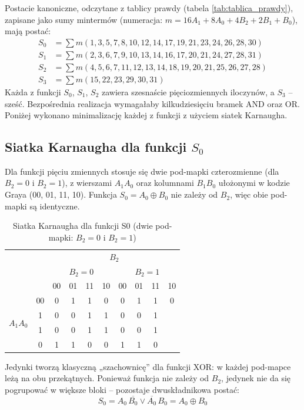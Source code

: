 \documentclass[11pt]{article}
\begin{document}
Postacie kanoniczne, odczytane z tablicy prawdy (tabela \ref{tab:tablica_prawdy}), zapisane jako sumy mintermów (numeracja: \(m = 16A_1 + 8A_0 + 4B_2 + 2B_1 + B_0\)), mają postać:
\begin{align}
S_0 &= \sum m(1,3,5,7,8,10,12,14,17,19,21,23,24,26,28,30) \\
S_1 &= \sum m(2,3,6,7,9,10,13,14,16,17,20,21,24,27,28,31) \\
S_2 &= \sum m(4,5,6,7,11,12,13,14,18,19,20,21,25,26,27,28) \\
S_3 &= \sum m(15,22,23,29,30,31)
\end{align}
Każda z funkcji \(S_0\), \(S_1\), \(S_2\) zawiera szesnaście pięciozmiennych iloczynów, a \(S_3\) -- sześć. Bezpośrednia realizacja wymagałaby kilkudziesięciu bramek AND oraz OR. Poniżej wykonano minimalizację każdej z funkcji z użyciem siatek Karnaugha.

\subsection{Siatka Karnaugha dla funkcji \(S_0\)}

Dla funkcji pięciu zmiennych stosuje się dwie pod-mapki czterozmienne (dla \(B_2=0\) i \(B_2=1\)), z wierszami \(A_1A_0\) oraz kolumnami \(B_1B_0\) ułożonymi w kodzie Graya (00, 01, 11, 10). Funkcja \(S_0 = A_0 \oplus B_0\) nie zależy od \(B_2\), więc obie pod-mapki są identyczne.
\begin{table}[H]
\centering
\caption{Siatka Karnaugha dla funkcji S0 (dwie pod-mapki: $B_2=0$ i $B_2=1$)}
\label{tab:kmap_S0}
\setlength{\tabcolsep}{5.5pt}
\begin{tabular}{cc|c|c|c|c|c|c|c|c}
\multicolumn{2}{c}{} & \multicolumn{8}{c}{$B_2$} \\
\multicolumn{2}{c}{} & \multicolumn{4}{c}{$B_2=0$} & \multicolumn{4}{c}{$B_2=1$} \\
\multicolumn{2}{c}{} & 00 & 01 & 11 & 10 & 00 & 01 & 11 & 10 \\
\hline
\multirow{4}{*}{$A_1A_0$} & 00 & 0 & 1 & 1 & 0 & 0 & 1 & 1 & 0 \\
01 & 1 & 0 & 0 & 1 & 1 & 0 & 0 & 1 \\
11 & 1 & 0 & 0 & 1 & 1 & 0 & 0 & 1 \\
10 & 0 & 1 & 1 & 0 & 0 & 1 & 1 & 0 \\
\hline
\end{tabular}
\end{table}

Jedynki tworzą klasyczną „szachownicę” dla funkcji XOR: w każdej pod-mapce leżą na obu przekątnych. Ponieważ funkcja nie zależy od \(B_2\), jedynek nie da się pogrupować w większe bloki -- pozostaje dwuskładnikowa postać:
\begin{equation}
S_0 = A_0\,\overline{B_0} \lor \overline{A_0}\,B_0 = A_0 \oplus B_0
\end{equation}
\end{document}
